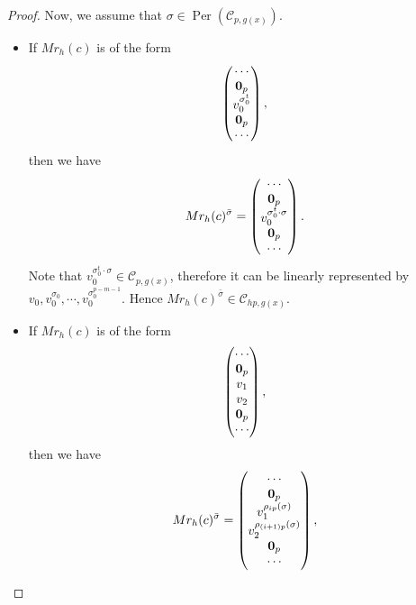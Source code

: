 \documentclass[10pt,a4paper]{amsart}
\begin{document}
\begin{proof}
    Now, we assume that $\sigma\in \operatorname{Per}(\mathcal{C}_{p,g(x)})$. 
    \begin{itemize}
        \item If $Mr_{h}(c)$ is of the form
        \[
            \begin{pmatrix}
                \cdots \\
                {\bf 0}_p \\
                v_0^{\sigma_0^t} \\
                {\bf 0}_p \\
                \cdots
            \end{pmatrix},
        \]
        then we have
        \[
            Mr_{h}(c)^{\bar{\sigma}} = \begin{pmatrix}
                \cdots \\
                {\bf 0}_p \\
                v_0^{\sigma_0^t\cdot\sigma} \\
                {\bf 0}_p \\
                \cdots
            \end{pmatrix}.
        \]
        Note that $v_0^{\sigma_0^t\cdot\sigma}\in\mathcal{C}_{p,g(x)}$, therefore it can be linearly represented by $v_0,v_0^{\sigma_0},\cdots,v_0^{\sigma_0^{p-m-1}}$. Hence $Mr_{h}(c)^{\bar{\sigma}}\in \mathcal{C}_{hp,g(x)}$. 
        \item If $Mr_{h}(c)$ is of the form
        \[
            \begin{pmatrix}
                \cdots \\
                {\bf 0}_p \\
                v_1 \\
                v_2 \\
                {\bf 0}_p \\
                \cdots
            \end{pmatrix},
        \]
        then we have
        \[
            Mr_{h}(c)^{\bar{\sigma}} = \begin{pmatrix}
                \cdots \\
                {\bf 0}_p \\
                v_1^{\rho_{ip}(\sigma)} \\
                v_2^{\rho_{(i+1)p}(\sigma)} \\
                {\bf 0}_p \\
                \cdots
            \end{pmatrix},
\]
\end{itemize}
\end{proof}
\end{document}
